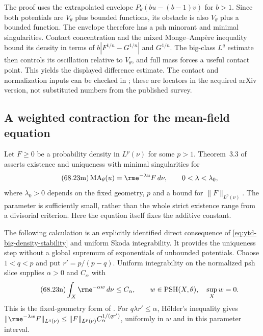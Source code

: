 The proof uses the extrapolated envelope
$P_\theta(bu-(b-1)v)$ for $b>1$. Since both potentials are
$V_\theta$ plus bounded functions, its obstacle is also
$V_\theta$ plus a bounded function. The envelope therefore has a
psh minorant and minimal singularities. Contact concentration and
the mixed Monge--Amp\`ere inequality bound its density in terms of
$b|F^{1/n}-G^{1/n}|$ and $G^{1/n}$. The big-class
$L^q$ estimate then controls its oscillation relative to
$V_\theta$, and full mass forces a useful contact point.
This yields the displayed difference estimate. The contact and
normalization inputs can be checked in
\cite[Theorem~2.7, Lemma~2.9 and Lemma~3.5]{DDL23RelativeV2};
these are locators in the acquired arXiv version, not substituted
numbers from the published survey.

\subsection{A weighted contraction for the mean-field equation}
\label{sec:ytd-big-weighted-contraction}

Let $F\geq0$ be a probability density in $L^p(\nu)$ for some
$p>1$. Theorem~3.3 of \cite{DangZhangZhou26UniquenessV1}
asserts existence and uniqueness with minimal singularities for
\[
\tag{68.23m}\label{eq:ytd-big-small-mean-field}
 \operatorname{MA}_\theta(u)=\rme^{-\lambda u}F\,d\nu,
 \qquad 0<\lambda<\lambda_0,
\]
where $\lambda_0>0$ depends on the fixed geometry, $p$ and a
bound for $\|F\|_{L^p(\nu)}$. The parameter is sufficiently
small, rather than the whole strict existence range from a
divisorial criterion. Here the equation itself fixes the additive
constant.

The following calculation is an explicitly identified direct
consequence of \eqref{eq:ytd-big-density-stability} and uniform
Skoda integrability. It provides the uniqueness step without a
global supremum of exponentials of unbounded potentials.
Choose $1<q<p$ and put $r'=p/(p-q)$. Uniform integrability on
the normalized psh slice supplies $\alpha>0$ and $C_\alpha$ with
\[
\tag{68.23n}\label{eq:ytd-big-uniform-exponential}
 \int_X\rme^{-\alpha w}\,d\nu\leq C_\alpha,
 \qquad w\in\operatorname{PSH}(X,\theta),\quad\sup_Xw=0.
\]
This is the fixed-geometry form of
\cite[Theorem~2.2]{DangZhangZhou26UniquenessV1}.
For $q\lambda r'\leq\alpha$, H\"older's inequality gives
$\|\rme^{-\lambda w}F\|_{L^q(\nu)}
 \leq\|F\|_{L^p(\nu)}C_\alpha^{1/(qr')}$,
uniformly in $w$ and in this parameter interval.

